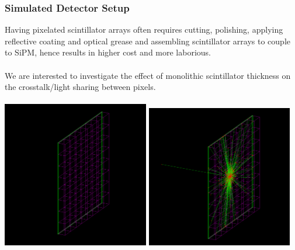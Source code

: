 \documentclass[xcolor=x11names, compress, handout]{beamer}
\renewcommand{\(}{\begin{columns}}
\renewcommand{\)}{\end{columns}}
\newcommand{\<}[1]{\begin{column}{#1}}
\renewcommand{\>}{\end{column}}
\begin{document}
\begin{frame}
\frametitle{Simulated Detector Setup}
\scriptsize
Having pixelated scintillator arrays often requires cutting, polishing, applying reflective coating and optical grease and assembling scintillator arrays to couple to SiPM, hence results in higher cost and more laborious. \ \\
\ \\
We are interested to investigate the effect of monolithic scintillator thickness on the crosstalk/light sharing between pixels. \\
\ \\
\centering 
\includegraphics[width=0.48\textwidth, height=0.49\textheight]{images/monolithic_pixelarray.png}
\includegraphics[width=0.48\textwidth, height=0.49\textheight]{images/monolithic_pixelarray1.png}
\end{frame}
\end{document}
